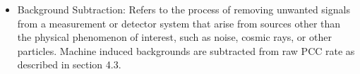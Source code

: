 \begin{itemize}
\item Background Subtraction: Refers to the process of removing unwanted signals from a measurement or detector system that arise from sources other than the physical phenomenon of interest, such as noise, cosmic rays, or other particles. Machine induced backgrounds are subtracted from raw PCC rate as described in section 4.3. %

\end{itemize}
